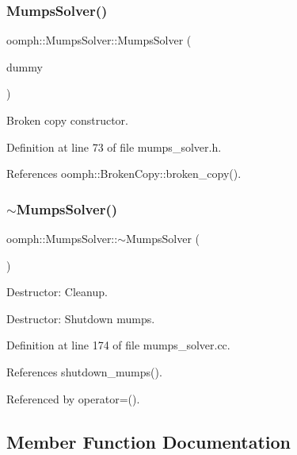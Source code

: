 \subsubsection{\texorpdfstring{Mumps\+Solver()}{MumpsSolver()}\hspace{0.1cm}{\footnotesize\ttfamily [2/2]}}
{\footnotesize\ttfamily oomph\+::\+Mumps\+Solver\+::\+Mumps\+Solver (\begin{DoxyParamCaption}\item[{const \hyperlink{classoomph_1_1MumpsSolver}{Mumps\+Solver} \&}]{dummy }\end{DoxyParamCaption})\hspace{0.3cm}{\ttfamily [inline]}}



Broken copy constructor. 



Definition at line 73 of file mumps\+\_\+solver.\+h.



References oomph\+::\+Broken\+Copy\+::broken\+\_\+copy().

\mbox{\label{classoomph_1_1MumpsSolver_a20e6116da9911337fb80486bcfaf7eb4}} 
\subsubsection{\texorpdfstring{$\sim$\+Mumps\+Solver()}{~MumpsSolver()}}
{\footnotesize\ttfamily oomph\+::\+Mumps\+Solver\+::$\sim$\+Mumps\+Solver (\begin{DoxyParamCaption}{ }\end{DoxyParamCaption})}



Destructor\+: Cleanup. 

Destructor\+: Shutdown mumps. 

Definition at line 174 of file mumps\+\_\+solver.\+cc.



References shutdown\+\_\+mumps().



Referenced by operator=().



\subsection{Member Function Documentation}
\mbox{\label{classoomph_1_1MumpsSolver_a92ab601b671c2b7eea44a470aa5ec4f3}} 
